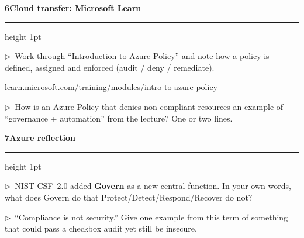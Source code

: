 \documentclass[11pt]{article}
\newcommand{\wbsection}[1]{\par\vspace{11pt}\noindent
  {\large\bfseries\color{kred}#1}\par\vspace{2pt}
  {\color{kred!35}\hrule height 1pt}\par\vspace{6pt}}
\newcommand{\task}[1]{\par\vspace{4pt}\noindent
  \textcolor{kred}{\textbf{$\triangleright$}}~#1\par\vspace{2pt}}
\renewcommand{\emph}[1]{\textup{#1}}
\begin{document}
\wbsection{6\quad Cloud transfer: Microsoft Learn}
\task{Work through ``Introduction to Azure Policy'' and note how a policy is \emph{defined}, \emph{assigned} and \emph{enforced} (audit / deny / remediate).}
\par\noindent\mbox{\href{https://learn.microsoft.com/training/modules/intro-to-azure-policy/}{learn.microsoft.com/training/modules/intro-to-azure-policy}}
\task{How is an Azure Policy that \emph{denies} non-compliant resources an example of ``governance +
automation'' from the lecture? One or two lines.}

\wbsection{7\quad Azure reflection}
\task{NIST CSF~2.0 added \textbf{Govern} as a new central function. In your own words, what does Govern do
that Protect/Detect/Respond/Recover do not?}
\task{``Compliance is not security.'' Give one example from this term of something that could pass a
checkbox audit yet still be insecure.}
\end{document}
